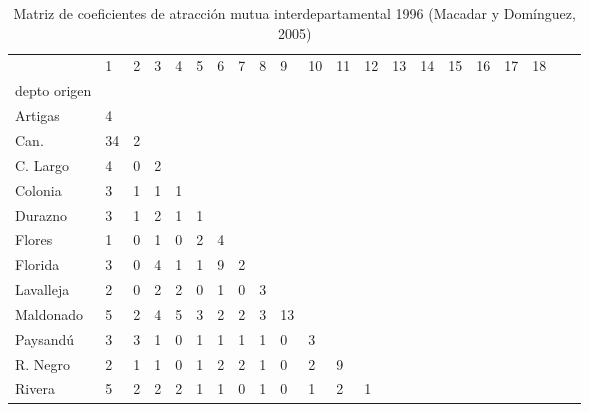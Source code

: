 \begin{table}
\centering
\caption{Matriz de coeficientes de atracción mutua interdepartamental 1996 (Macadar y Domínguez, 2005)}
\begin{tabular}{lp{0.25cm}p{0.25cm}p{0.25cm}p{0.25cm}p{0.25cm}p{0.25cm}p{0.25cm}p{0.25cm}p{0.25cm}p{0.25cm}p{0.25cm}p{0.25cm}p{0.25cm}p{0.25cm}p{0.25cm}p{0.25cm}p{0.25cm}p{0.25cm}p{0.25cm}p{0.25cm}}
\toprule
{} &   1 &  2 &  3 &  4 &  5 &  6 &  7 &  8 &  9 &  10 &  11 &  12 &  13 &  14 &  15 &  16 &  17 &  18 \\
depto origen &     &    &    &    &    &    &    &    &    &     &     &     &     &     &     &     &     &     \\
\midrule
Artigas      &   4 &    &    &    &    &    &    &    &    &     &     &     &     &     &     &     &     &     \\
Can.         &  34 &  2 &    &    &    &    &    &    &    &     &     &     &     &     &     &     &     &     \\
C. Largo     &   4 &  0 &  2 &    &    &    &    &    &    &     &     &     &     &     &     &     &     &     \\
Colonia      &   3 &  1 &  1 &  1 &    &    &    &    &    &     &     &     &     &     &     &     &     &     \\
Durazno      &   3 &  1 &  2 &  1 &  1 &    &    &    &    &     &     &     &     &     &     &     &     &     \\
Flores       &   1 &  0 &  1 &  0 &  2 &  4 &    &    &    &     &     &     &     &     &     &     &     &     \\
Florida      &   3 &  0 &  4 &  1 &  1 &  9 &  2 &    &    &     &     &     &     &     &     &     &     &     \\
Lavalleja    &   2 &  0 &  2 &  2 &  0 &  1 &  0 &  3 &    &     &     &     &     &     &     &     &     &     \\
Maldonado    &   5 &  2 &  4 &  5 &  3 &  2 &  2 &  3 & 13 &     &     &     &     &     &     &     &     &     \\
Paysandú     &   3 &  3 &  1 &  0 &  1 &  1 &  1 &  1 &  0 &   3 &     &     &     &     &     &     &     &     \\
R. Negro     &   2 &  1 &  1 &  0 &  1 &  2 &  2 &  1 &  0 &   2 &   9 &     &     &     &     &     &     &     \\
Rivera       &   5 &  2 &  2 &  2 &  1 &  1 &  0 &  1 &  0 &   1 &   2 &   1 &     &     &     &     &     &     \\

\end{tabular}
\end{table}
